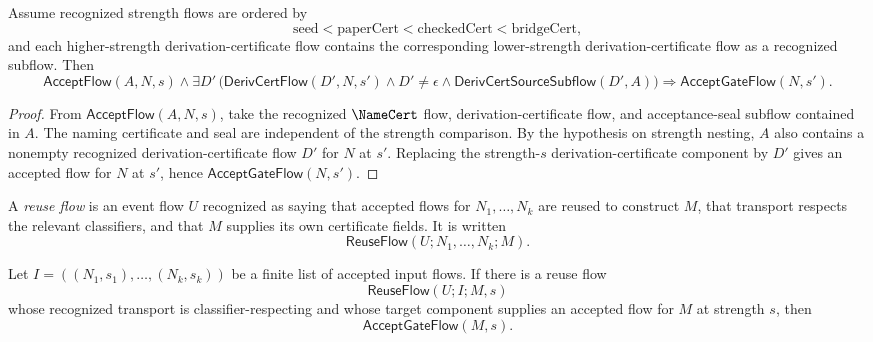 \begin{theorem}
\label{thm:derivcert-generated-gate-monotone-strength}
Assume recognized strength flows are ordered by
$$
  \mathrm{seed}
  <
  \mathrm{paperCert}
  <
  \mathrm{checkedCert}
  <
  \mathrm{bridgeCert},
$$
and each higher-strength derivation-certificate flow contains the corresponding lower-strength derivation-certificate flow as a recognized subflow. Then
$$
  \mathsf{AcceptFlow}(A,N,s)
  \wedge
  \exists D'\,
  \big(
    \mathsf{DerivCertFlow}(D',N,s')
    \wedge
    D' \neq \epsilon
    \wedge
    \mathsf{DerivCertSourceSubflow}(D',A)
  \big)
  \Longrightarrow
  \mathsf{AcceptGateFlow}(N,s').
$$
\end{theorem}

\begin{proof}
From $\mathsf{AcceptFlow}(A,N,s)$, take the recognized $\NameCert$ flow, derivation-certificate flow, and acceptance-seal subflow contained in $A$. The naming certificate and seal are independent of the strength comparison. By the hypothesis on strength nesting, $A$ also contains a nonempty recognized derivation-certificate flow $D'$ for $N$ at $s'$. Replacing the strength-$s$ derivation-certificate component by $D'$ gives an accepted flow for $N$ at $s'$, hence $\mathsf{AcceptGateFlow}(N,s')$.
\end{proof}

\begin{definition}
\label{def:derivcert-generated-reuse-flow}
A \emph{reuse flow} is an event flow $U$ recognized as saying that accepted flows for $N_1,\ldots,N_k$ are reused to construct $M$, that transport respects the relevant classifiers, and that $M$ supplies its own certificate fields. It is written
$$
  \mathsf{ReuseFlow}(U;N_1,\ldots,N_k;M).
$$
\end{definition}

\begin{theorem}
\label{thm:derivcert-generated-reuse-closure}
Let $I=((N_1,s_1),\ldots,(N_k,s_k))$ be a finite list of accepted input flows. If there is a reuse flow
$$
  \mathsf{ReuseFlow}(U;I;M,s)
$$
whose recognized transport is classifier-respecting and whose target component supplies an accepted flow for $M$ at strength $s$, then
$$
  \mathsf{AcceptGateFlow}(M,s).
$$
\end{theorem}

